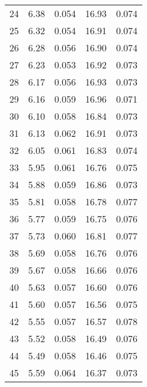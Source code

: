 \begin{table}
\begin{tabular}{c|ll|ll}
24 & 6.38 & 0.054 & 16.93 & 0.074 \\
25 & 6.32 & 0.054 & 16.91 & 0.074 \\
26 & 6.28 & 0.056 & 16.90 & 0.074 \\
27 & 6.23 & 0.053 & 16.92 & 0.073 \\
28 & 6.17 & 0.056 & 16.93 & 0.073 \\
29 & 6.16 & 0.059 & 16.96 & 0.071 \\
30 & 6.10 & 0.058 & 16.84 & 0.073 \\
31 & 6.13 & 0.062 & 16.91 & 0.073 \\
32 & 6.05 & 0.061 & 16.83 & 0.074 \\
33 & 5.95 & 0.061 & 16.76 & 0.075 \\
34 & 5.88 & 0.059 & 16.86 & 0.073 \\
35 & 5.81 & 0.058 & 16.78 & 0.077 \\
36 & 5.77 & 0.059 & 16.75 & 0.076 \\
37 & 5.73 & 0.060 & 16.81 & 0.077 \\
38 & 5.69 & 0.058 & 16.76 & 0.076 \\
39 & 5.67 & 0.058 & 16.66 & 0.076 \\
40 & 5.63 & 0.057 & 16.60 & 0.076 \\
41 & 5.60 & 0.057 & 16.56 & 0.075 \\
42 & 5.55 & 0.057 & 16.57 & 0.078 \\
43 & 5.52 & 0.058 & 16.49 & 0.076 \\
44 & 5.49 & 0.058 & 16.46 & 0.075 \\
45 & 5.59 & 0.064 & 16.37 & 0.073 \\
               \hline
        \end{tabular}
    \end{table}
    \clearpage

